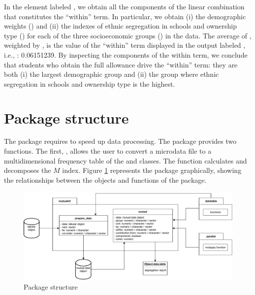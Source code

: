 In the element labeled , we obtain all the components of the linear combination that constitutes the ``within'' term. In particular, we obtain (i) the demographic weights () and (ii) the indexes of ethnic segregation in schools and ownership type () for each of the three socioeconomic groups () in the data. The average of , weighted by , is the value of the ``within'' term displayed in the output labeled , i.e., : 0.06151239. By inspecting the components of the within term, we conclude that students who obtain the full allowance drive the ``within'' term: they are both (i) the largest demographic group and (ii) the group where ethnic segregation in schools and ownership type is the highest.

\section{Package structure}
The  package requires  \citep{data.table} to speed up data processing. The package provides two functions. The first, , allows the user to convert a microdata file to a multidimensional frequency table of the  and  classes. The  function calculates and decomposes the $M$ index. Figure \ref{figure:diagram-1} represents the package graphically, showing the relationships between the objects and functions of the package.

\begin{figure}[H]
  \centering
  \includegraphics[width=\textwidth]{diagram_v3.pdf}
  \caption{Package structure}
  \label{figure:diagram-1}
\end{figure}

